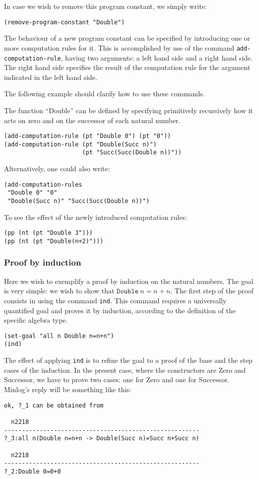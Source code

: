 \documentclass[12pt]{amsart}
\newcommand{\inquotes}[1]{``#1''}
\newcommand{\mi}{Minlog}
\begin{document}
In case we wish to remove this program constant, we simply write:
\begin{verbatim}
(remove-program-constant "Double")
\end{verbatim}

The behaviour of a new program constant can be specified by
introducing one or more computation rules for it.  This is accomplished
by use of the command \texttt{add-computation-rule}, having two
arguments: a left hand side and a right hand side.  The right hand
side specifies the result of the computation rule for the argument
indicated in the left hand side.

The following example should clarify how to use these commands.

The function \inquotes{Double} can be defined by specifying
primitively recursively how it acts on zero and on the successor of
each natural number.

\begin{verbatim}
(add-computation-rule (pt "Double 0") (pt "0"))
(add-computation-rule (pt "Double(Succ n)")
                      (pt "Succ(Succ(Double n))"))
\end{verbatim}

Alternatively, one could also write:
\begin{verbatim}
(add-computation-rules
 "Double 0" "0"
 "Double(Succ n)" "Succ(Succ(Double n))")
\end{verbatim}

To see the effect of the newly introduced computation rules:
\begin{verbatim}
(pp (nt (pt "Double 3")))
(pp (nt (pt "Double(n+2)")))
\end{verbatim}


\subsubsection{Proof by induction}
Here we wish to exemplify a proof by induction on the natural numbers.
The goal is very simple: we wish to show that $\mathtt{Double}\ n=n+n$.
The first step of the proof consists in using the command
\texttt{ind}.  This command requires a universally quantified goal and
proves it by induction, according to the definition of the specific
algebra type.
\begin{verbatim}
(set-goal "all n Double n=n+n")
(ind)
\end{verbatim}

The effect of applying \texttt{ind} is to refine the goal to a proof
of the base and the step cases of the induction.  In the present case,
where the constructors are Zero and Successor, we have to prove two
cases: one for Zero and one for Successor.  \mi's reply will be
something like this:
\begin{verbatim}
ok, ?_1 can be obtained from

  n2218
-------------------------------------------------------
?_3:all n(Double n=n+n -> Double(Succ n)=Succ n+Succ n)

  n2218
-------------------------------------------------------
?_2:Double 0=0+0
\end{verbatim}
\end{document}
